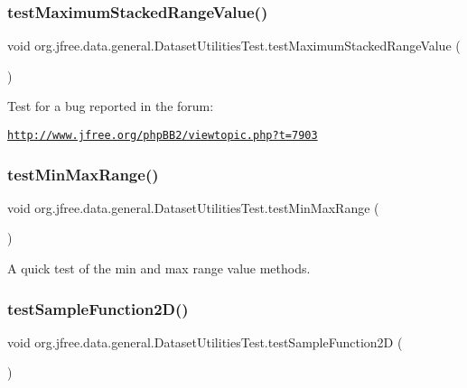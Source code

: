 \subsubsection{\texorpdfstring{test\+Maximum\+Stacked\+Range\+Value()}{testMaximumStackedRangeValue()}}
{\footnotesize\ttfamily void org.\+jfree.\+data.\+general.\+Dataset\+Utilities\+Test.\+test\+Maximum\+Stacked\+Range\+Value (\begin{DoxyParamCaption}{ }\end{DoxyParamCaption})}

Test for a bug reported in the forum\+:

\href{http://www.jfree.org/phpBB2/viewtopic.php?t=7903}{\tt http\+://www.\+jfree.\+org/php\+B\+B2/viewtopic.\+php?t=7903} \mbox{\label{classorg_1_1jfree_1_1data_1_1general_1_1_dataset_utilities_test_a327abe58fe348daa90de6f5b0217e5c6}} 
\subsubsection{\texorpdfstring{test\+Min\+Max\+Range()}{testMinMaxRange()}}
{\footnotesize\ttfamily void org.\+jfree.\+data.\+general.\+Dataset\+Utilities\+Test.\+test\+Min\+Max\+Range (\begin{DoxyParamCaption}{ }\end{DoxyParamCaption})}

A quick test of the min and max range value methods. \mbox{\label{classorg_1_1jfree_1_1data_1_1general_1_1_dataset_utilities_test_ae421f414606a0cfde8e350d7d8c09374}} 
\subsubsection{\texorpdfstring{test\+Sample\+Function2\+D()}{testSampleFunction2D()}}
{\footnotesize\ttfamily void org.\+jfree.\+data.\+general.\+Dataset\+Utilities\+Test.\+test\+Sample\+Function2D (\begin{DoxyParamCaption}{ }\end{DoxyParamCaption})}

